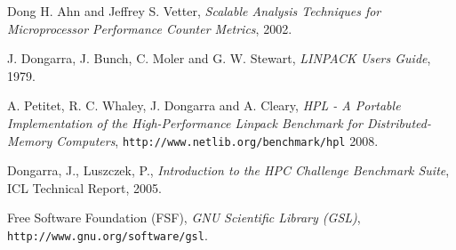 \documentclass[a4paper]{report}
\begin{document}
\begin{thebibliography}{9}
  Dong H. Ahn and Jeffrey S. Vetter,
  \emph{Scalable Analysis Techniques for Microprocessor Performance Counter
    Metrics},
  2002.
  
  J. Dongarra, J. Bunch, C. Moler and G. W. Stewart, 
  \emph{LINPACK Users Guide},
  1979.
  
  A. Petitet, R. C. Whaley, J. Dongarra and A. Cleary, 
  \emph{HPL - A Portable Implementation of the High-Performance Linpack
    Benchmark for Distributed-Memory Computers}, {\tt http://www.netlib.org/benchmark/hpl}
  2008.

  Dongarra, J., Luszczek, P.,
  \emph{Introduction to the HPC Challenge Benchmark Suite}, ICL Technical Report,
  2005.  
  
  Free Software Foundation (FSF), \emph{GNU Scientific Library (GSL)},
  {\tt http://www.gnu.org/software/gsl}.

\end{thebibliography}
\end{document}

